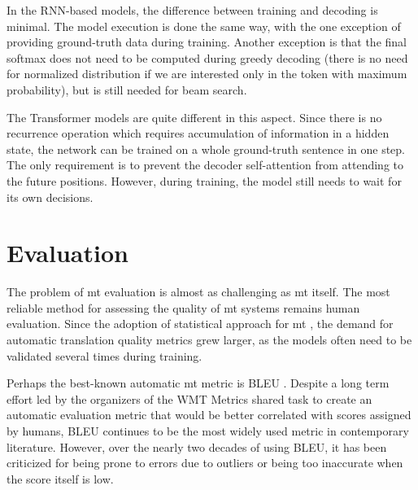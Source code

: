 In the RNN-based models, the difference between training and decoding is
minimal. The model execution is done the same way, with the one exception of
providing ground-truth data during training. Another exception is that the final
softmax does not need to be computed during greedy decoding (there is no need
for normalized distribution if we are interested only in the token with maximum
probability), but is still needed for beam search.

The Transformer models are quite different in this aspect. Since there is no
recurrence operation which requires accumulation of information in a hidden
state, the network can be trained on a whole ground-truth sentence in one step.
The only requirement is to prevent the decoder self-attention from attending to
the future positions. However, during training, the model still needs to wait
for its own decisions.




\section{Evaluation}
\label{sec:evaluation}


The problem of \gls{mt} evaluation is almost as challenging as \gls{mt} itself.
The most reliable method for assessing the quality of \gls{mt} systems remains
human evaluation.  Since the adoption of statistical approach for \gls{mt}
\citep{brown-etal-1993-mathematics,koehn-etal-2003-statistical}, the demand for
automatic translation quality metrics grew larger, as the models often need to
be validated several times during training.

Perhaps the best-known automatic \gls{mt} metric is BLEU
\citep{papineni2002bleu}.  Despite a long term effort led by the organizers of
the WMT Metrics shared task to create an automatic evaluation metric that would
be better correlated with scores assigned by humans, BLEU continues to be the
most widely used metric in contemporary literature. However, over the nearly two
decades of using BLEU, it has been criticized for being prone to errors due to
outliers or being too inaccurate when the score itself is low.
\citep{callison-burch-etal-2006-evaluating,bojar-etal-2010-tackling,reiter2018structured,mathur-etal-2020-tangled}




